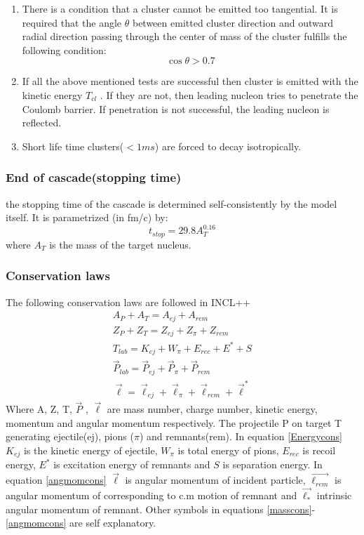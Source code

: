 \begin{enumerate}[label=(\roman*)]
	\item There is a condition that a cluster cannot be emitted too tangential. It is required that the angle $\theta$ between emitted cluster direction and outward radial direction passing through the center of mass of the cluster fulfills the following condition:
	\begin{equation}
		\cos\theta>0.7
	\end{equation}
	\item If all the above mentioned tests are successful then cluster is emitted with
	the kinetic energy $T_{cl}$ . If they are not, then leading nucleon tries to penetrate the Coulomb barrier. If penetration is not successful, the leading nucleon is reflected.
	\item Short life time clusters($<1 ms$) are forced to decay isotropically.
\end{enumerate}
\subsubsection{End of cascade(stopping time) }
the stopping time of the cascade is determined self-consistently by the model itself. It is parametrized (in fm/c) by:
\begin{equation}
	t_{stop}=29.8A_{T}^{0.16}
\end{equation}
where $A_T$ is the mass of the target nucleus.
\subsubsection{Conservation laws}
The following conservation laws are followed in INCL++ 
\begin{gather}
	A_P + A_T =A_{ej}+A_{rem} \label{masscons} \\ 
	Z_P  + Z_T = Z_{ej}+Z_{\pi}+Z_{rem} \label{chargecons} \\
	T_{lab} = K_{ej} +W_{\pi}+E_{rec}+E^{*}+S \label{Energycons} \\ 
	\vec{P}_{lab} = \vec{P}_{ej} +\vec{P}_{\pi}+\vec{P}_{rem} \label{momcons} \\ 
	\vec{\ell} = \vec{\ell}_{ej}+\vec{\ell}_{\pi}+\vec{\ell}_{rem}+\vec{\ell}^* \label{angmomcons}
\end{gather}
Where A, Z, T, $\vec{P}$ , $\vec{\ell}$ are mass number, charge number, kinetic energy, momentum and angular momentum respectively. The projectile P on target T generating ejectile(ej), pions ($\pi$) and remnants(rem). In equation \eqref{Energycons} $K_{ej}$ is the kinetic energy of ejectile, $W_\pi$ is total energy of pions, $E_{rec}$ is recoil energy, $E^*$ is excitation energy of remnants and $S$ is separation energy. In equation \eqref{angmomcons} $\vec{\ell}$ is angular momentum of incident particle,  $\vec{\ell_{rem}}$ is angular momentum of corresponding to c.m motion of remnant and $\vec{\ell_{*}}$ intrinsic angular momentum of remnant. Other symbols in equations \eqref{masscons}-\eqref{angmomcons} are self explanatory.
